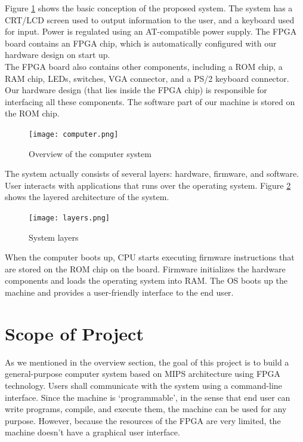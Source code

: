 \documentclass[oneside]{book}
\begin{document}
Figure \ref{computer} shows the basic conception of the proposed system.
The system has a CRT/LCD screen used to output information to the user,
and a keyboard used for input. Power is regulated using an AT-compatible
power supply. The FPGA board contains an FPGA chip, which is automatically
configured with our hardware design on start up.\\

The FPGA board also contains other components, including a ROM chip,
a RAM chip, LEDs, switches, VGA connector, and a PS/2 keyboard connector.
Our hardware design (that lies inside the FPGA chip) is responsible for
interfacing all these components. The software part of our machine
is stored on the ROM chip.

\begin{figure}[H]
\begin{center}
\texttt{[image: computer.png]}
\end{center}
\caption{Overview of the computer system}
\label{computer}
\end{figure}

The system actually consists of several layers: hardware, firmware, and
software. User interacts with applications that runs over the operating
system. Figure \ref{layers} shows the layered architecture of the system.

\begin{figure}[H]
\begin{center}
\texttt{[image: layers.png]}
\end{center}
\caption{System layers}
\label{layers}
\end{figure}

When the computer boots up, CPU starts executing firmware instructions that
are stored on the ROM chip on the board. Firmware initializes the hardware
components and loads the operating system into RAM. The OS boots up
the machine and provides a user-friendly interface to the end user.

\section{Scope of Project}

As we mentioned in the overview section, the goal of this project is to build a
general-purpose computer system based on MIPS architecture
using FPGA technology. Users shall communicate with the system using
a command-line interface. Since the machine is `programmable', in the
sense that end user can write programs, compile, and execute them, the machine
can be used for any purpose. However, because the resources of the FPGA are
very limited, the machine doesn't have a graphical user interface.
\end{document}
